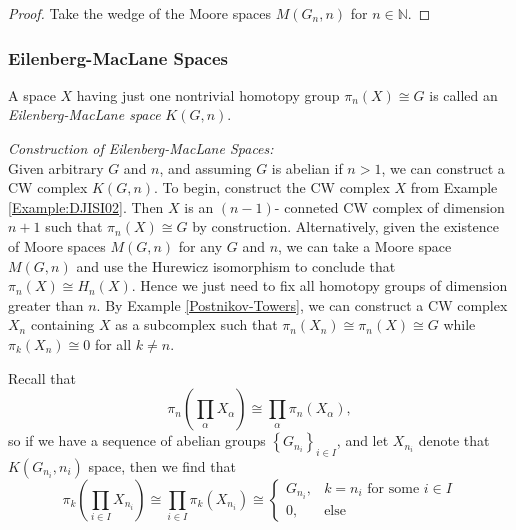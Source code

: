 \begin{proof}
    Take the wedge of the Moore spaces $M\left( G_n,n \right) $ for
    $n \in \mathbb{N} $.
\end{proof}



\subsubsection{Eilenberg-MacLane Spaces}

\begin{definition}
    A space $X$ having just one nontrivial homotopy
    group $\pi_n (X) \cong G$ is called
    an \textit{Eilenberg-MacLane space} $K(G,n)$. 
\end{definition}


\textit{Construction of Eilenberg-MacLane Spaces:}\\
Given arbitrary $G$ and $n$, and assuming $G$ is abelian
if $n>1$, we can construct a CW complex
$K(G,n)$. To begin, construct the
CW complex $X$ from Example \ref{Example:DJISI02}. Then
$X$ is an $(n-1) $- conneted CW complex of dimension
$n+1$ such that $\pi_n (X) \cong G$ by construction. 
Alternatively, given the existence of Moore spaces
$M(G,n)$ for any $G$ and $n$, we can take a Moore space
$M(G,n)$ and use the Hurewicz isomorphism
to conclude that $\pi_n (X) \cong H_n(X)$.
Hence
we just need to fix all homotopy groups of dimension
greater than $n$. By
Example \ref{Postnikov-Towers}, we can
construct a CW complex $X_n$ containing $X$ as a subcomplex
such that
$\pi_n (X_n) \cong \pi_n (X) \cong G$ while
$\pi_k(X_n) \cong 0$ for all $k \neq  n$.


\begin{example}
    Recall that
    \[
    \pi_n \left( \prod_{\alpha}X_{\alpha} \right) 
    \cong \prod_{\alpha} \pi_n \left( X_{\alpha} \right) ,
    \] 
    so if we have a sequence
    of abelian groups $\left\{ G_{n_i} \right\}_{i \in I}$, and let
    $X_{n_i}$ denote that $K(G_{n_i}, n_{i})$ space, then
    we find that
    \[
    \pi_k( \prod_{i \in I} X_{n_i})
    \cong \prod_{i \in I} \pi_k \left( X_{n_i} \right) 
    \cong \begin{cases}
        G_{n_i},& k = n_{i} \text{ for some }i \in I\\
        0,& \text{else}
    \end{cases}
    \] 
\end{example}

